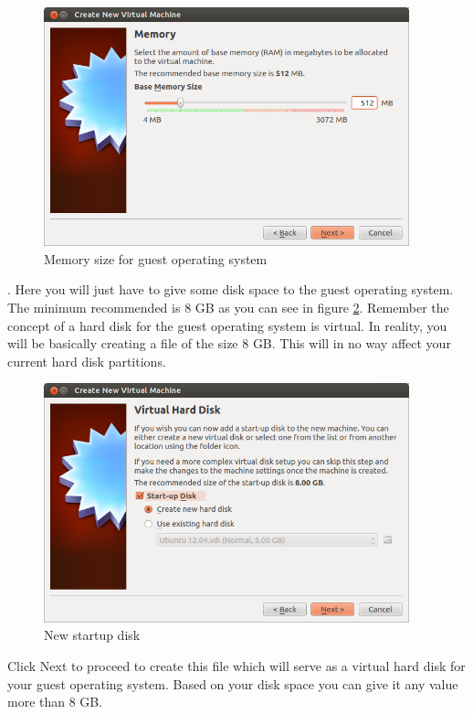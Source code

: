 \begin{figure}[!h]	
	\centering
	\includegraphics[width=300pt]{./images/installation/virtualbox/wizard-memory.png}
	\caption{Memory size for guest operating system}	
	\label{fig:wizard-memory}	
\end{figure}

\par {}. Here you will just have to give some disk space to the guest operating system. The minimum recommended is 8 GB as you can see in figure \ref{fig:wizard-newharddisk}.  Remember the concept of a hard disk for the guest operating system is virtual. In reality, you will be basically creating a file of the size 8 GB. This will in no way affect your current hard disk partitions. \\ 

\begin{figure}[!h]	
	\centering
	\includegraphics[width=300pt]{./images/installation/virtualbox/wizard-newharddisk.png}
	\caption{New startup disk}	
	\label{fig:wizard-newharddisk}	
\end{figure}

\par \noindent Click Next to proceed to create this file which will serve as a virtual hard disk for your guest operating system. Based on your disk space you can give it any value more than 8 GB.\\

